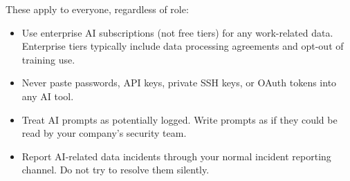 These apply to everyone, regardless of role:

\begin{itemize}
  \item Use enterprise AI subscriptions (not free tiers) for any work-related data.
        Enterprise tiers typically include data processing agreements and opt-out of
        training use.
  \item Never paste passwords, API keys, private SSH keys, or OAuth tokens into any
        AI tool.
  \item Treat AI prompts as potentially logged. Write prompts as if they could be read
        by your company's security team.
  \item Report AI-related data incidents through your normal incident reporting channel.
        Do not try to resolve them silently.
\end{itemize}
